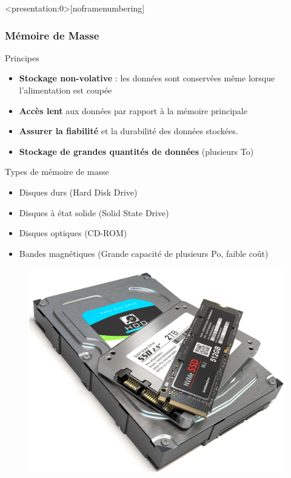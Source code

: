 \documentclass[8pt]{beamer}
\begin{document}
\begin{frame}<presentation:0>[noframenumbering]
    \frametitle{Mémoire de Masse}
    \begin{block}{Principes}
        \begin{itemize}
            \item \textbf{Stockage non-volative} : les données sont conservées
                  même lorsque l'alimentation est coupée
            \item \textbf{Accès lent} aux données par rapport à la mémoire
                  principale
            \item \textbf{Assurer la fiabilité} et la durabilité des données
                  stockées.
            \item \textbf{Stockage de grandes quantités de données} (plusieurs
                  To)

        \end{itemize}
    \end{block}
    \begin{exampleblock}{Types de mémoire de masse}
        \begin{itemize}
            \item Disques durs (Hard Disk Drive)
            \item Disques à état solide (Solid State Drive)
            \item Disques optiques (CD-ROM)
            \item Bandes magnétiques (Grande capacité de plusieurs Po, faible
                  coût)
        \end{itemize}
    \end{exampleblock}
    \begin{figure}
        \centering
        \includegraphics[width=.25\textwidth]{figures/HDD+SSD.png}
    \end{figure}
\end{frame}
\end{document}
